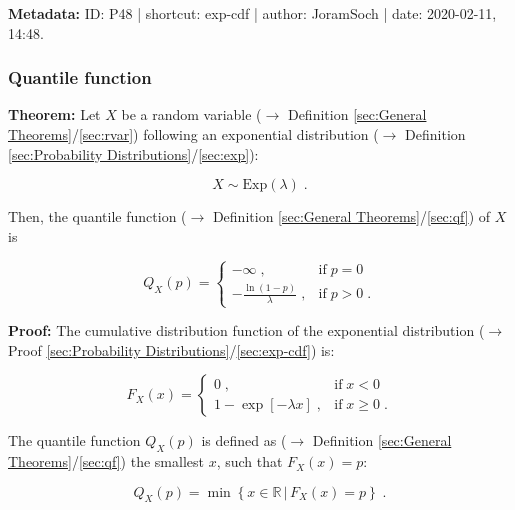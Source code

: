 \documentclass[a4paper,12pt,twoside]{book}
\begin{document}
\vspace{1em}
\textbf{Metadata:} ID: P48 | shortcut: exp-cdf | author: JoramSoch | date: 2020-02-11, 14:48.
\vspace{1em}



\subsubsection[\textbf{Quantile function}]{Quantile function} \label{sec:exp-qf}
\setcounter{equation}{0}

\textbf{Theorem:} Let $X$ be a random variable ($\rightarrow$ Definition \ref{sec:General Theorems}/\ref{sec:rvar}) following an exponential distribution ($\rightarrow$ Definition \ref{sec:Probability Distributions}/\ref{sec:exp}):

\begin{equation} \label{eq:exp-qf-exp}
X \sim \mathrm{Exp}(\lambda) \; .
\end{equation}

Then, the quantile function ($\rightarrow$ Definition \ref{sec:General Theorems}/\ref{sec:qf}) of $X$ is

\begin{equation} \label{eq:exp-qf-exp-qf}
Q_X(p) = \left\{
\begin{array}{rl}
-\infty \; , & \text{if} \; p = 0 \\
-\frac{\ln(1-p)}{\lambda} \; , & \text{if} \; p > 0 \; .
\end{array}
\right.
\end{equation}


\vspace{1em}
\textbf{Proof:} The cumulative distribution function of the exponential distribution ($\rightarrow$ Proof \ref{sec:Probability Distributions}/\ref{sec:exp-cdf}) is:

\begin{equation} \label{eq:exp-qf-exp-cdf}
F_X(x) = \left\{
\begin{array}{rl}
0 \; , & \text{if} \; x < 0 \\
1 - \exp[-\lambda x] \; , & \text{if} \; x \geq 0 \; .
\end{array}
\right.
\end{equation}

The quantile function $Q_X(p)$ is defined as ($\rightarrow$ Definition \ref{sec:General Theorems}/\ref{sec:qf}) the smallest $x$, such that $F_X(x) = p$:

\begin{equation} \label{eq:exp-qf-qf}
Q_X(p) = \min \left\lbrace x \in \mathbb{R} \, \vert \, F_X(x) = p \right\rbrace \; .
\end{equation}
\end{document}
